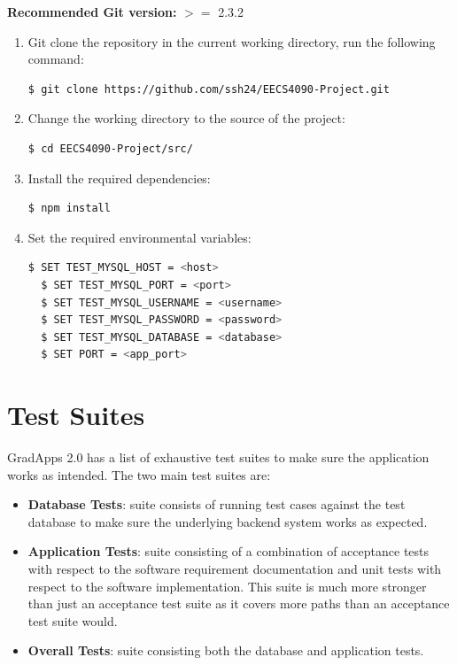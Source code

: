 \documentclass[fontsize=12pt,paper=letter,twoside]{scrartcl}
\begin{document}
\bigskip
\noindent \textbf{Recommended Git version:} $>=$ 2.3.2

\smallskip
\begin{enumerate}
\item Git clone the repository in the current working directory, run the following command:
\begin{lstlisting}[language=bash]
  $ git clone https://github.com/ssh24/EECS4090-Project.git
\end{lstlisting}
\item Change the working directory to the source of the project:
\begin{lstlisting}[language=bash]
  $ cd EECS4090-Project/src/
\end{lstlisting}
\item Install the required dependencies:
\begin{lstlisting}[language=bash]
  $ npm install
\end{lstlisting}
\item Set the required environmental variables:
\begin{lstlisting}[language=bash]
  $ SET TEST_MYSQL_HOST = <host>
  $ SET TEST_MYSQL_PORT = <port>
  $ SET TEST_MYSQL_USERNAME = <username>
  $ SET TEST_MYSQL_PASSWORD = <password>
  $ SET TEST_MYSQL_DATABASE = <database>
  $ SET PORT = <app_port>
\end{lstlisting}
\end{enumerate}


\newpage
\section{Test Suites}
GradApps 2.0 has a list of exhaustive test suites to make sure the application works as intended. The two main test suites are:

\begin{itemize}
\item \textbf{Database Tests}: suite consists of running test cases against the test database to make sure the underlying backend system works as expected.
\item \textbf{Application Tests}: suite consisting of a combination of acceptance tests with respect to the software requirement documentation and unit tests with respect to the software implementation. This suite is much more stronger than just an acceptance test suite as it covers more paths than an acceptance test suite would.
\item \textbf{Overall Tests}: suite consisting both the database and application tests.
\end{itemize}
\end{document}
